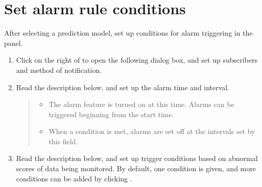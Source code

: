\documentclass[letterpaper,10pt,english]{sphinxmanual}
\begin{document}
\section{Set alarm rule conditions}
\label{\detokenize{anomaly/part02/index:alarm-rule-settings}}\label{\detokenize{anomaly/part02/index:id6}}
After selecting a prediction model, set up conditions for alarm triggering in the  panel.
\begin{enumerate}
\def\theenumi{\arabic{enumi}}
\def\labelenumi{\theenumi .}
\makeatletter\def\p@enumii{\p@enumi \theenumi .}\makeatother
\item {} 
Click  on the right of  to open the following dialog box, and set up subscribers and method of notification.
\begin{quote}

\begin{figure}[H]
\centering

\noindent{}
\end{figure}
\end{quote}

\item {} 
Read the description below, and set up the alarm time and interval.
\begin{quote}

\begin{figure}[H]
\centering

\noindent{}
\end{figure}
\begin{itemize}
\item {} 
 The alarm feature is turned on at this time. Alarms can be triggered beginning from the start time.

\item {} 
 When a condition is met, alarms are set off at the intervals set by this field.

\end{itemize}
\end{quote}

\item {} 
Read the description below, and set up trigger conditions based on abnormal scores of data being monitored. By default, one condition is given, and more conditions can be added by clicking .
\begin{quote}


\end{quote}
\end{enumerate}
\end{document}
